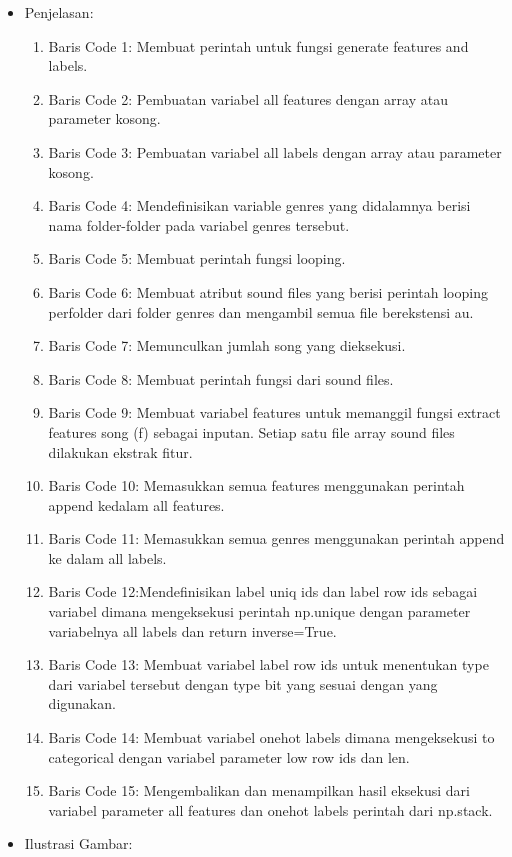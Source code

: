\begin{enumerate}
\begin{itemize}
\item Penjelasan:
\begin{enumerate}
\item Baris Code 1: Membuat perintah untuk fungsi generate features and labels.
\item Baris Code 2: Pembuatan variabel all features dengan array atau parameter kosong.
\item Baris Code 3: Pembuatan variabel all labels dengan array atau parameter kosong.
\item Baris Code 4: Mendefinisikan variable genres yang didalamnya berisi nama folder-folder pada variabel genres tersebut.
\item Baris Code 5: Membuat perintah fungsi looping.
\item Baris Code 6: Membuat atribut sound files yang berisi perintah looping perfolder dari folder genres dan mengambil semua file berekstensi au.
\item Baris Code 7: Memunculkan jumlah song yang dieksekusi.
\item Baris Code 8: Membuat perintah fungsi dari sound files.
\item Baris Code 9: Membuat variabel features untuk memanggil fungsi extract features song (f) sebagai inputan. Setiap satu file array sound files dilakukan ekstrak fitur.
\item Baris Code 10: Memasukkan semua features menggunakan perintah append kedalam all features.
\item Baris Code 11: Memasukkan semua genres menggunakan perintah append ke dalam all labels.
\item Baris Code 12:Mendefinisikan label uniq ids dan label row ids sebagai variabel dimana mengeksekusi perintah np.unique dengan parameter variabelnya all labels dan return inverse=True.
\item Baris Code 13: Membuat variabel label row ids untuk menentukan type dari variabel tersebut dengan type bit yang sesuai dengan yang digunakan.
\item Baris Code 14: Membuat variabel onehot labels dimana mengeksekusi to categorical dengan variabel parameter low row ids dan len.
\item Baris Code 15: Mengembalikan dan menampilkan hasil eksekusi dari variabel parameter all features dan onehot labels perintah dari np.stack.
\end{enumerate}

\item Ilustrasi Gambar:


\end{itemize}
\end{enumerate}
